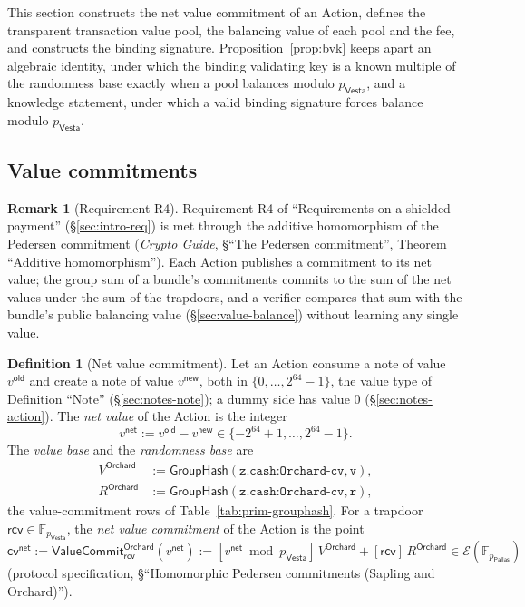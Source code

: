 \documentclass[11pt,a4paper]{article}
\theoremstyle{definition}
\newtheorem{definition}[theorem]{Definition}
\newtheorem{remark}[theorem]{Remark}
\newcommand{\F}{\mathbb{F}}
\newcommand{\cvsym}{\mathsf{cv}}
\newcommand{\Pallas}{\ensuremath{\mathsf{Pallas}}}
\newcommand{\Vesta}{\ensuremath{\mathsf{Vesta}}}
\newcommand{\Ep}{\ensuremath{\mathcal{E}}}
\newcommand{\GroupHash}{\ensuremath{\mathsf{GroupHash}}}
\newcommand{\rcv}{\ensuremath{\mathsf{rcv}}}
\begin{document}
This section constructs the net value commitment of an Action, defines the
transparent transaction value pool, the balancing value of each pool and the
fee, and constructs the binding signature. Proposition~\ref{prop:bvk} keeps
apart an algebraic identity, under which the binding validating key is a
known multiple of the randomness base exactly when a pool balances modulo
$p_{\Vesta}$, and a knowledge statement, under which a valid binding
signature forces balance modulo $p_{\Vesta}$.

\subsection{Value commitments}\label{sec:value-cv}

\begin{remark}[Requirement R4]
Requirement R4 of ``Requirements on a shielded payment''
(\S\ref{sec:intro-req}) is met through the additive homomorphism of the
Pedersen commitment (\emph{Crypto Guide}, \S``The Pedersen commitment'',
Theorem ``Additive homomorphism''). Each Action publishes a commitment to its
net value; the group sum of a bundle's commitments commits to the sum of the
net values under the sum of the trapdoors, and a verifier compares that sum
with the bundle's public balancing value (\S\ref{sec:value-balance}) without
learning any single value.
\end{remark}

\begin{definition}[Net value commitment]\label{def:cv-net}
Let an Action consume a note of value $v^{\mathsf{old}}$ and create a note of
value $v^{\mathsf{new}}$, both in $\{0, \dots, 2^{64} - 1\}$, the value type
of Definition ``Note'' (\S\ref{sec:notes-note}); a dummy side has value $0$
(\S\ref{sec:notes-action}). The \emph{net value} of the Action is the
integer
\[
  v^{\mathsf{net}} := v^{\mathsf{old}} - v^{\mathsf{new}}
    \in \{-2^{64} + 1, \dots, 2^{64} - 1\}.
\]
The \emph{value base} and the \emph{randomness base} are
\begin{align*}
  V^{\mathsf{Orchard}} &:= \GroupHash(\texttt{z.cash:Orchard-cv},
    \texttt{v}), \\
  R^{\mathsf{Orchard}} &:= \GroupHash(\texttt{z.cash:Orchard-cv},
    \texttt{r}),
\end{align*}
the value-commitment rows of Table~\ref{tab:prim-grouphash}. For a trapdoor
$\rcv \in \F_{p_{\Vesta}}$, the \emph{net value commitment} of the Action is
the point
\[
  \cvsym^{\mathsf{net}}
    := \mathsf{ValueCommit}^{\mathsf{Orchard}}_{\rcv}(v^{\mathsf{net}})
    := [v^{\mathsf{net}} \bmod p_{\Vesta}]\,V^{\mathsf{Orchard}}
       + [\rcv]\,R^{\mathsf{Orchard}}
    \in \Ep(\F_{p_{\Pallas}})
\]
(protocol specification, \S``Homomorphic Pedersen commitments (Sapling and
Orchard)'').
\end{definition}
\end{document}
